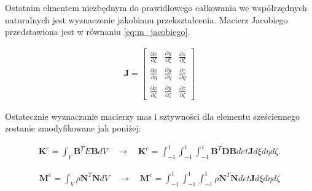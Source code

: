 Ostatnim elmentem niezbędnym do prawidłowego całkowania we współrzędnych naturalnych jest wyznaczenie jakobianu przekształcenia. Macierz Jacobiego przedstawiona jest w równaniu \ref{eq:m_jacobiego}.

\begin{gather} \label{eq:m_jacobiego}
	\textbf{J} = \begin{bmatrix} 
	 	\frac{\partial x}{\partial \xi} & \frac{\partial y}{\partial \xi} & \frac{\partial z}{\partial \xi} \\
	 	\frac{\partial x}{\partial \eta} & \frac{\partial y}{\partial \eta} & \frac{\partial z}{\partial \eta} \\
	 	\frac{\partial x}{\partial \zeta} & \frac{\partial y}{\partial \zeta} & \frac{\partial z}{\partial \zeta}
	\end{bmatrix}
\end{gather}

Ostatecznie wyznaczanie macierzy mas i sztywności dla elementu sześciennego zostanie zmodyfikowane jak poniżej:

\begin{equation} \label{eq:macierz_sztywnosci}
	\begin{aligned}
	\textbf{K}^e = \int_V {\textbf{B}}^T E \textbf{B} dV \quad \rightarrow \quad \textbf{K}^e =  \int_{-1}^1 \int_{-1}^1 \int_{-1}^1  {\textbf{B}}^T \textbf{D} \textbf{B} det\textbf{J} d\xi d\eta d\zeta.
	\end{aligned}
\end{equation}

\begin{equation} \label{eq:macierz_mas}
	\begin{aligned}
	\textbf{M}^e = \int_V \rho {\textbf{N}}^T \textbf{N} dV \quad \rightarrow \quad \textbf{M}^e = \int_{-1}^1 \int_{-1}^1 \int_{-1}^1 \rho {\textbf{N}}^T \textbf{N} det\textbf{J} d\xi d\eta d\zeta \\
	\end{aligned}
\end{equation}





















